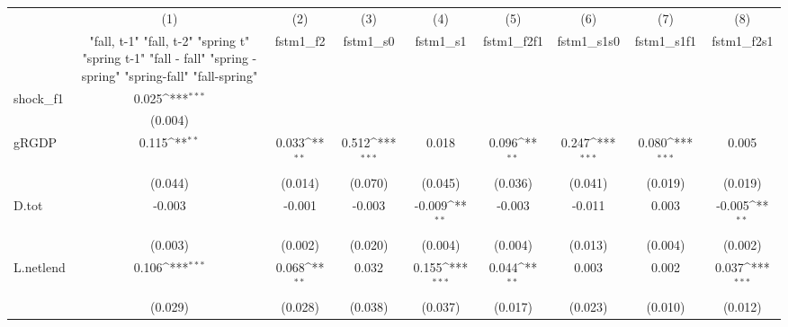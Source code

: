 {
\def\sym#1{\ifmmode^{#1}\else\(^{#1}\)\fi}
\begin{tabular}{l*{8}{c}}
\toprule
            &\multicolumn{1}{c}{(1)}&\multicolumn{1}{c}{(2)}&\multicolumn{1}{c}{(3)}&\multicolumn{1}{c}{(4)}&\multicolumn{1}{c}{(5)}&\multicolumn{1}{c}{(6)}&\multicolumn{1}{c}{(7)}&\multicolumn{1}{c}{(8)}\\
            &\multicolumn{1}{c}{  "fall, t-1" "fall, t-2" "spring t" "spring t-1"  "fall - fall" "spring - spring" "spring-fall" "fall-spring" }&\multicolumn{1}{c}{fstm1\_f2}&\multicolumn{1}{c}{fstm1\_s0}&\multicolumn{1}{c}{fstm1\_s1}&\multicolumn{1}{c}{fstm1\_f2f1}&\multicolumn{1}{c}{fstm1\_s1s0}&\multicolumn{1}{c}{fstm1\_s1f1}&\multicolumn{1}{c}{fstm1\_f2s1}\\
\midrule
shock\_f1    &       0.025\sym{***}&                     &                     &                     &                     &                     &                     &                     \\
            &     (0.004)         &                     &                     &                     &                     &                     &                     &                     \\
\addlinespace
gRGDP       &       0.115\sym{**} &       0.033\sym{**} &       0.512\sym{***}&       0.018         &       0.096\sym{**} &       0.247\sym{***}&       0.080\sym{***}&       0.005         \\
            &     (0.044)         &     (0.014)         &     (0.070)         &     (0.045)         &     (0.036)         &     (0.041)         &     (0.019)         &     (0.019)         \\
\addlinespace
D.tot       &      -0.003         &      -0.001         &      -0.003         &      -0.009\sym{**} &      -0.003         &      -0.011         &       0.003         &      -0.005\sym{**} \\
            &     (0.003)         &     (0.002)         &     (0.020)         &     (0.004)         &     (0.004)         &     (0.013)         &     (0.004)         &     (0.002)         \\
\addlinespace
L.netlend   &       0.106\sym{***}&       0.068\sym{**} &       0.032         &       0.155\sym{***}&       0.044\sym{**} &       0.003         &       0.002         &       0.037\sym{***}\\
            &     (0.029)         &     (0.028)         &     (0.038)         &     (0.037)         &     (0.017)         &     (0.023)         &     (0.010)         &     (0.012)         \\

\end{tabular}}
